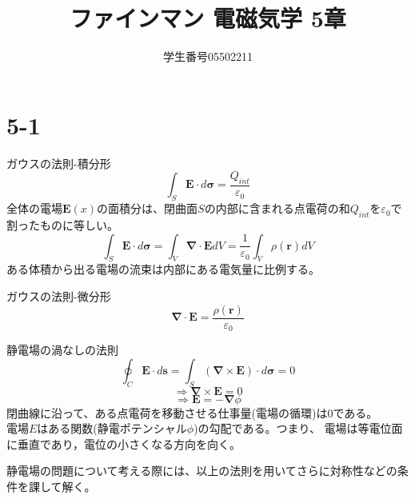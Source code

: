 \documentclass{jsarticle}
\title{ファインマン 電磁気学 5章}
\author{学生番号05502211}
\date{}
\begin{document}
\maketitle
\section*{5-1}
\noindent
\begin{itembox}[l]{ガウスの法則-積分形}
\[\int_{S}\bm{E}\cdot d\bm{\sigma}=\frac{Q_{int}}{\varepsilon_{0}}\]
全体の電場\(\bm{E}(x)\)の面積分は、閉曲面\(S\)の内部に含まれる点電荷の和\(Q_{int}\)を\(\varepsilon_{0}\)で割ったものに等しい。
\[\int_{S}\bm{E}\cdot d\bm{\sigma}=\int_{V}\bm{\nabla}\cdot\bm{E}dV=\frac{1}{\varepsilon_{0}}\int_{V}\rho(\bm{r})dV\]
ある体積から出る電場の流束は内部にある電気量に比例する。
\end{itembox}

\begin{itembox}[l]{ガウスの法則-微分形}
\[\bm{\nabla}\cdot\bm{E}=\frac{\rho(\bm{r})}{\varepsilon_{0}}\]
\end{itembox}

\begin{itembox}[l]{静電場の渦なしの法則}
\[\oint_{C}\bm{E}\cdot d\bm{s}=\int_{S}(\bm{\nabla}\times\bm{E})\cdot d\bm{\sigma}=0\]
\[\Rightarrow\bm{\nabla}\times\bm{\bm{E}}=0\]
\[\Rightarrow\bm{E}=-\bm{\nabla}\phi\]
閉曲線に沿って、ある点電荷を移動させる仕事量(電場の循環)は0である。\\
電場\(E\)はある関数(静電ポテンシャル\(\phi\))の勾配である。つまり、
電場は等電位面に垂直であり，電位の小さくなる方向を向く。
\end{itembox}
静電場の問題について考える際には、以上の法則を用いてさらに対称性などの条件を課して解く。\\
\newpage
\end{document}
